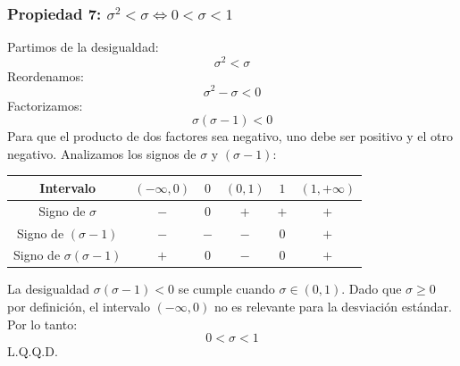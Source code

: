 \documentclass[12pt, letterpaper]{article}
\begin{document}
            \subsubsection{Propiedad 7: $\sigma^2 < \sigma \iff 0 < \sigma < 1$}
                Partimos de la desigualdad:
                \[\sigma^2 < \sigma \]
                Reordenamos:
                \[\sigma^2-\sigma < 0 \]
                Factorizamos:
                \[\sigma(\sigma-1) < 0 \]
                Para que el producto de dos factores sea negativo, uno debe ser positivo y el otro negativo. Analizamos los signos de $\sigma$ y $(\sigma-1)$:
                
                \begin{center}
                    \begin{tabular}{c|ccccc}
                        Intervalo & $(-\infty, 0)$ & $0$ & $(0, 1)$ & $1$ & $(1, +\infty)$ \\
                        \hline
                        Signo de $\sigma$ & $-$ & $0$ & $+$ & $+$ & $+$ \\
                        Signo de $(\sigma-1)$ & $-$ & $-$ & $-$ & $0$ & $+$ \\
                        \hline
                        Signo de $\sigma(\sigma-1)$ & $+$ & $0$ & $-$ & $0$ & $+$ \\
                    \end{tabular}
                \end{center}
                
                La desigualdad $\sigma(\sigma-1) < 0$ se cumple cuando $\sigma \in (0, 1)$.
                Dado que $\sigma \ge 0$ por definición, el intervalo $(-\infty, 0)$ no es relevante para la desviación estándar.
                Por lo tanto:
                \[0 < \sigma < 1 \]
                L.Q.Q.D.
\end{document}
